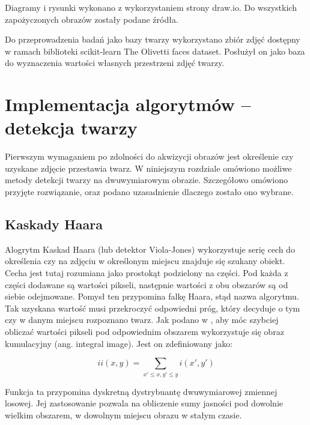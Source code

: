 \documentclass[oneside, eng]{mgr}
\begin{document}
Diagramy i rysunki wykonano z wykorzystaniem strony draw.io. Do wszystkich zapożyczonych obrazów zostały podane źródła.

Do przeprowadzenia badań jako bazy twarzy wykorzystano zbiór zdjęć dostępny w ramach biblioteki scikit-learn The Olivetti faces dataset. Posłużył on jako baza do wyznaczenia wartości własnych przestrzeni zdjęć twarzy.

\newpage

\chapter{Implementacja algorytmów – detekcja twarzy}

Pierwszym wymaganiem po zdolności do akwizycji obrazów jest określenie czy uzyskane zdjęcie przestawia twarz. W niniejszym rozdziale omówiono możliwe metody detekcji twarzy na dwuwymiarowym obrazie. Szczegółowo omówiono przyjęte rozwiązanie, oraz podano uzasadnienie dlaczego zostało ono wybrane.

\section{Kaskady Haara}
Alogrytm Kaskad Haara (lub detektor Viola-Jones) wykorzystuje serię cech do określenia czy na zdjęciu w określonym miejscu znajduje się szukany obiekt. Cecha jest tutaj rozumiana jako prostokąt podzielony na części. Pod każda z części dodawane są wartości pikseli, następnie wartości z obu obszarów są od siebie odejmowane. Pomysł ten przypomina falkę Haara, stąd nazwa algorytmu. Tak uzyskana wartość musi przekroczyć odpowiedni próg, który decyduje o tym czy w danym miejscu rozpoznano twarz. Jak podano w \cite{Kaskada Haara}, aby móc szybciej obliczać wartości pikseli pod odpowiednim obszarem wykorzystuje się obraz kumulacyjny (ang. integral image). Jest on zdefiniowany jako:

\begin{equation}
	ii(x,y) = \sum_{x' \leq x, y' \leq y} i(x',y')
\end{equation}

Funkcja ta przypomina dyskretną dystrybuantę dwuwymiarowej zmiennej losowej. Jej zastosowanie pozwala na obliczenie sumy jasności pod dowolnie wielkim obszarem, w dowolnym miejscu obrazu w stałym czasie.
\end{document}
